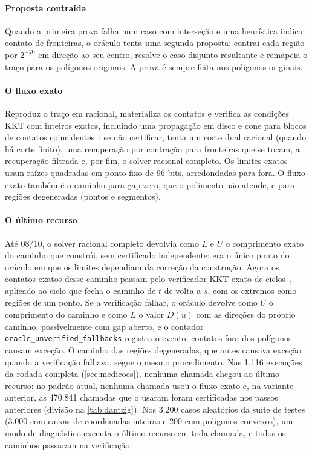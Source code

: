 \documentclass[11pt,a4paper]{article}
\theoremstyle{plain}\newtheorem{proposicao}{Proposição}
\theoremstyle{definition}\newtheorem{definicao}{Definição}
\theoremstyle{plain}\newtheorem{teorema}{Teorema}
\newcommand{\code}[1]{\texttt{\small #1}}
\begin{document}
\paragraph{Proposta contraída} Quando a primeira prova falha num caso com interseção e uma heurística indica contato de fronteiras, o oráculo tenta uma segunda proposta: contrai cada região por \(2^{-20}\) em direção ao seu centro, resolve o caso disjunto resultante e remapeia o traço para os polígonos originais. A prova é sempre feita nos polígonos originais.

\paragraph{O fluxo exato} Reproduz o traço em racional, materializa os contatos e verifica as condições KKT com inteiros exatos, incluindo uma propagação em disco e cone para blocos de contatos coincidentes~\cite{certificadociclo}; se não certificar, tenta um corte dual racional (quando há corte finito), uma recuperação por contração para fronteiras que se tocam, a recuperação filtrada e, por fim, o solver racional completo. Os limites exatos usam raízes quadradas em ponto fixo de 96 bits, arredondadas para fora. O fluxo exato também é o caminho para gap zero, que o polimento não atende, e para regiões degeneradas (pontos e segmentos).

\paragraph{O último recurso} Até 08/10, o solver racional completo devolvia como \(L\) e \(U\) o comprimento exato do caminho que constrói, sem certificado independente; era o único ponto do oráculo em que os limites dependiam da correção da construção. Agora os contatos exatos desse caminho passam pelo verificador KKT exato de ciclos~\cite{certificadociclo}, aplicado ao ciclo que fecha o caminho de \(t\) de volta a \(s\), com os extremos como regiões de um ponto. Se a verificação falhar, o oráculo devolve como \(U\) o comprimento do caminho e como \(L\) o valor \(D(u)\) com as direções do próprio caminho, possivelmente com gap aberto, e o contador \code{oracle\_unverified\_fallbacks} registra o evento; contatos fora dos polígonos causam exceção. O caminho das regiões degeneradas, que antes causava exceção quando a verificação falhava, segue o mesmo procedimento. Nas 1.116 execuções da rodada completa (\cref{sec:medicoes}), nenhuma chamada chegou ao último recurso: no padrão atual, nenhuma chamada usou o fluxo exato e, na variante anterior, as 470.841 chamadas que o usaram foram certificadas nos passos anteriores (divisão na \cref{tab:dantzig}). Nos 3.200 casos aleatórios da suíte de testes (3.000 com caixas de coordenadas inteiras e 200 com polígonos convexos), um modo de diagnóstico executa o último recurso em toda chamada, e todos os caminhos passaram na verificação.
\end{document}
